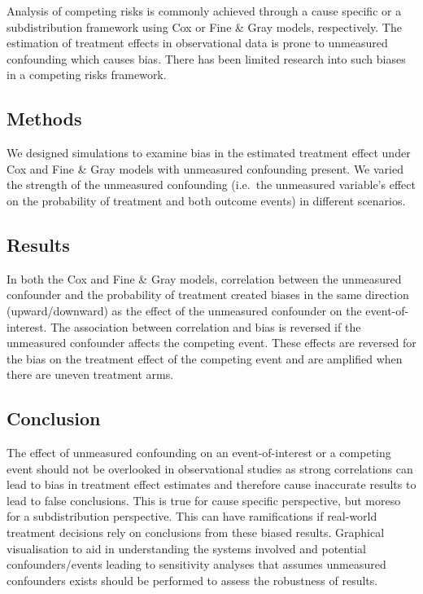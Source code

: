 \documentclass[12pt,PhD,twoside,openright]{muthesis}
\begin{document}
Analysis of competing risks is commonly achieved through a cause specific or a subdistribution framework using Cox or Fine \& Gray models, respectively. The estimation of treatment effects in observational data is prone to unmeasured confounding which causes bias. There has been limited research into such biases in a competing risks framework.

\hypertarget{methods-1}{%
\subsection*{Methods}\label{methods-1}}

We designed simulations to examine bias in the estimated treatment effect under Cox and Fine \& Gray models with unmeasured confounding present. We varied the strength of the unmeasured confounding (i.e.~the unmeasured variable's effect on the probability of treatment and both outcome events) in different scenarios.

\hypertarget{results}{%
\subsection*{Results}\label{results}}

In both the Cox and Fine \& Gray models, correlation between the unmeasured confounder and the probability of treatment created biases in the same direction (upward/downward) as the effect of the unmeasured confounder on the event-of-interest. The association between correlation and bias is reversed if the unmeasured confounder affects the competing event. These effects are reversed for the bias on the treatment effect of the competing event and are amplified when there are uneven treatment arms.

\hypertarget{conclusion}{%
\subsection*{Conclusion}\label{conclusion}}

The effect of unmeasured confounding on an event-of-interest or a competing event should not be overlooked in observational studies as strong correlations can lead to bias in treatment effect estimates and therefore cause inaccurate results to lead to false conclusions. This is true for cause specific perspective, but moreso for a subdistribution perspective. This can have ramifications if real-world treatment decisions rely on conclusions from these biased results. Graphical visualisation to aid in understanding the systems involved and potential confounders/events leading to sensitivity analyses that assumes unmeasured confounders exists should be performed to assess the robustness of results.
\end{document}
